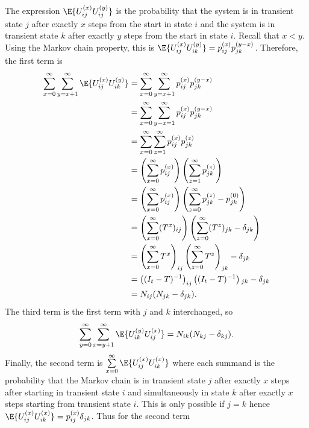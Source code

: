 \documentclass[12pt]{article}
\begin{document}
The expression \( \E{U_{ij}^{(x)} U_{ij}^{(y)}} \) is the probability
that the system is in transient state \( j \) after exactly \( x \)
steps from the start in state \( i \) and the system is in transient
state \( k \) after exactly \( y \) steps from the start in state \( i
\).  Recall that \( x < y \).
Using the Markov chain property, this is \( \E{U_{ij}^{(x)} U_{ik}^{(y)}}
= p_{ij}^{(x)} p_{jk}^{(y-x)} \).  Therefore, the first term is
\begin{align*}
    \sum\limits_{x=0}^{\infty} \sum\limits_{y=x+1}^{\infty} \E{U_{ij}^{(x)}
    U_{ik}^{(y)}} &= \sum\limits_{x=0}^{\infty} \sum\limits_{y=x+1}^{\infty}
    p_{ij}^{(x)} p_{jk}^{(y-x)} \\
    & = \sum\limits_{x=0}^{\infty} \sum\limits_{y-x=1}^{\infty} p_{ij}^{%
    (x)} p_{jk}^{(y-x)} \\
    & = \sum\limits_{x=0}^{\infty} \sum\limits_{z=1}^{\infty} p_{ij}^{(x)}
    p_{jk}^{(z)} \\
    & = \left( \sum\limits_{x=0}^{\infty} p_{ij}^{(x)} \right) \left(
    \sum\limits_{z=1}^{\infty} p_{jk}^{(z)} \right) \\
    & = \left( \sum\limits_{x=0}^{\infty} p_{ij}^{(x)} \right) \left(
    \sum\limits_{z=0}^{\infty} p_{jk}^{(z)} - p_{jk}^{(0)}\right) \\
    & = \left( \sum\limits_{x=0}^{\infty} (T^x){}_{ij} \right) \left(
    \sum\limits_{z=0}^{\infty} (T^z){}_{jk} - \delta_{jk}\right) \\
    & = \left( \sum\limits_{x=0}^{\infty} T^x \right)_{ij} \left(
    \sum\limits_{z=0}^{\infty} T^z\right)_{jk} - \delta_{jk} \\
    & = \left( (I_t-T)^{-1} \right)_{ij} \left( (I_t-T)^{-1} \right){}_{jk}
    - \delta_{jk} \\
    &= N_{ij}(N_{jk}-\delta_{jk}).
\end{align*}
The third term is the first term with \( j \) and \( k \) interchanged,
so
\[
    \sum\limits_{y=0}^{\infty} \sum\limits_{x=y+1}^{\infty} \E{U_{ik}^{(y)}
    U_{ij}^{(x)}} = N_{ik}(N_{kj}-\delta_{kj}).
\] Finally, the second term is \( \sum\limits_{x=0}^{\infty} \E{U_{ij}^{(x)}
U_{ik}^{(x)}} \) where each summand is the probability that the Markov
chain is in transient state \( j \) after exactly \( x \) steps after
starting in transient state \( i \) and simultaneously in state \( k \)
after exactly \( x \) steps starting from transient state \( i \).  This
is only possible if \( j=k \) hence \( \E{U_{ij}^{(x)} U_{ik}^{(x)}} = p_{ij}^{(x)}
\delta_{jk} \).  Thus for the second term
\end{document}
